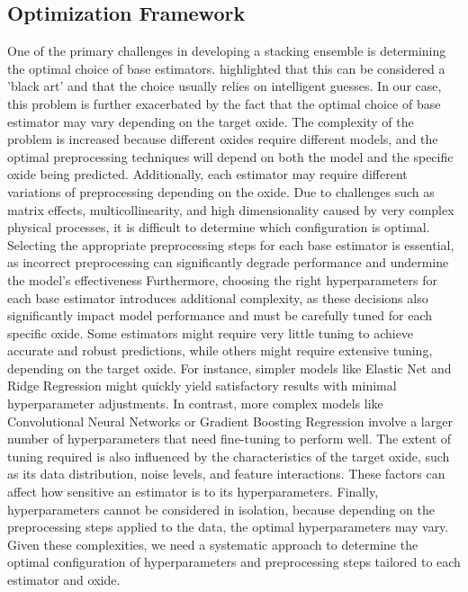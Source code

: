 \subsection{Optimization Framework}\label{sec:optimization_framework}
One of the primary challenges in developing a stacking ensemble is determining the optimal choice of base estimators. \citet{wolpertstacked_1992} highlighted that this can be considered a 'black art' and that the choice usually relies on intelligent guesses. 
In our case, this problem is further exacerbated by the fact that the optimal choice of base estimator may vary depending on the target oxide. 
The complexity of the problem is increased because different oxides require different models, and the optimal preprocessing techniques will depend on both the model and the specific oxide being predicted. 
Additionally, each estimator may require different variations of preprocessing depending on the oxide. 
Due to challenges such as matrix effects, multicollinearity, and high dimensionality caused by very complex physical processes, it is difficult to determine which configuration is optimal.
Selecting the appropriate preprocessing steps for each base estimator is essential, as incorrect preprocessing can significantly degrade performance and undermine the model's effectiveness
Furthermore, choosing the right hyperparameters for each base estimator introduces additional complexity, as these decisions also significantly impact model performance and must be carefully tuned for each specific oxide. 
Some estimators might require very little tuning to achieve accurate and robust predictions, while others might require extensive tuning, depending on the target oxide. 
For instance, simpler models like Elastic Net and Ridge Regression might quickly yield satisfactory results with minimal hyperparameter adjustments. 
In contrast, more complex models like Convolutional Neural Networks or Gradient Boosting Regression involve a larger number of hyperparameters that need fine-tuning to perform well. 
The extent of tuning required is also influenced by the characteristics of the target oxide, such as its data distribution, noise levels, and feature interactions. 
These factors can affect how sensitive an estimator is to its hyperparameters.
Finally, hyperparameters cannot be considered in isolation, because depending on the preprocessing steps applied to the data, the optimal hyperparameters may vary.
Given these complexities, we need a systematic approach to determine the optimal configuration of hyperparameters and preprocessing steps tailored to each estimator and oxide.

